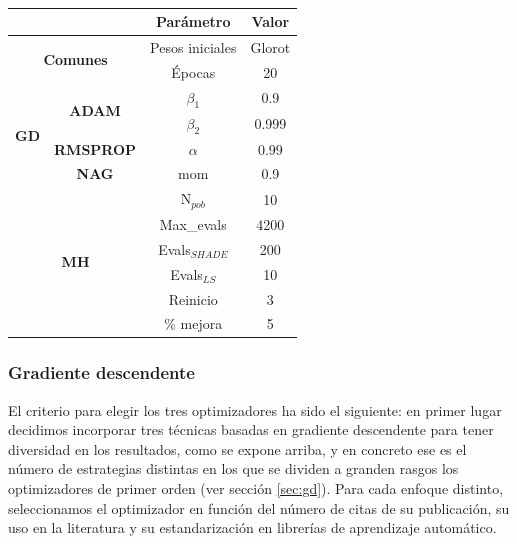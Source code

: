 \begin{table}[]
\centering
\begin{tabular}{cccc}
\multicolumn{2}{c}{}                                          & \textbf{Parámetro} & \textbf{Valor} \\ \hline
\multicolumn{2}{c}{\multirow{2}{*}{\textbf{Comunes}}}         & Pesos iniciales    & Glorot         \\
\multicolumn{2}{c}{}                                          & Épocas             & 20             \\ \hline
\multirow{4}{*}{\textbf{GD}} & \multirow{2}{*}{\textbf{ADAM}} & $\beta_1$          & 0.9            \\
                             &                                & $\beta_2$          & 0.999          \\
                             & \textbf{RMSPROP}               & $\alpha$           & 0.99           \\
                             & \textbf{NAG}                   & mom                & 0.9            \\ \hline
\multicolumn{2}{c}{\multirow{6}{*}{\textbf{MH}}}              & N$_{pob}$          & 10             \\
\multicolumn{2}{c}{}                                          & Max\_evals         & 4200           \\
\multicolumn{2}{c}{}                                          & Evals$_{SHADE}$    & 200            \\
\multicolumn{2}{c}{}                                          & Evals$_{LS}$       & 10             \\
\multicolumn{2}{c}{}                                          & Reinicio           & 3              \\
\multicolumn{2}{c}{}                                          & \% mejora          & 5              \\ \hline
\end{tabular}
\caption{}
\label{tab:params}
\end{table}

\subsubsection{Gradiente descendente}

El criterio para elegir los tres optimizadores ha sido el siguiente: en primer lugar decidimos incorporar tres técnicas basadas en gradiente descendente para tener diversidad en los resultados, como se expone arriba, y en concreto ese es el número de estrategias distintas en los que se dividen a granden rasgos los optimizadores de primer orden (ver sección \ref{sec:gd}). Para cada enfoque distinto, seleccionamos el optimizador en función del número de citas de su publicación, su uso en la literatura y su estandarización en librerías de aprendizaje automático.


